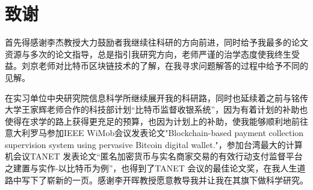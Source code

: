  
\chapter{致谢}
首先得感谢李杰教授大力鼓励者我继续往科研的方向前进，同时给予我最多的论文资源与多次的论文指导，总是指引我研究方向，老师严谨的治学态度使我终生受益。刘京老师对比特币区块链技术的了解，在我寻求问题解答的过程中给予不同的见解。

在实习单位中央研究院信息科学所继续展开我的科研路，同时也延续着之前与铭传大学王家辉老师合作的科技部计划“比特币监督收银系统”，因为有着计划的补助也使得在求学的路上获得更充足的预算，也因为计划上的补助，使我能够顺利地前往意大利罗马参加IEEE WiMob会议发表论文"Blockchain-based payment collection supervision system using pervasive Bitcoin digital wallet."，参加台湾最大的计算机会议TANET 发表论文“匿名加密货币与实名商家交易的有效行动支付监督平台之建置与实作-以比特币为例”\supercite{tanet}，也得到了TANET 会议的最佳论文奖，在我人生道路中写下了崭新的一页。感谢李开晖教授愿意教导我并让我在其旗下做科学研究。